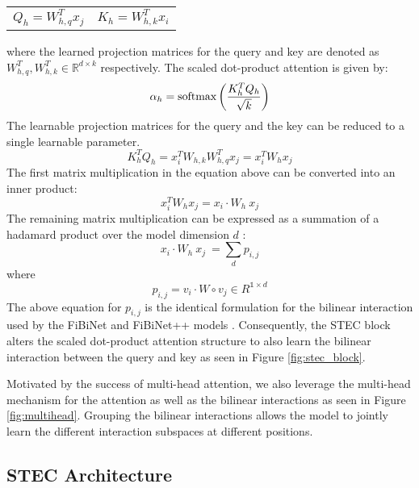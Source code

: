 \documentclass{article}
\begin{document}
\noindent
\begin{tabularx}{\linewidth}{@{}XX@{}}
\begin{equation}
  Q_h=W_{h,q}^T x_j
\end{equation}
&
\begin{equation}
  K_h=W_{h,k}^T x_i
\end{equation}
\end{tabularx}
where the learned projection matrices for the query and key are denoted as $W_{h,q}^T, W_{h,k}^T \in \mathbb{R}^{d \times k}$ respectively.
The scaled dot-product attention is given by:
\begin{equation}\alpha_h=\textup{softmax}\left ( \frac{K_h^T Q_h}{\sqrt{k}}\right ) \end{equation}
The learnable projection matrices for the query and the key can be reduced to a single learnable parameter.
\begin{equation} K_h^T Q_h = x_i^T W_{h,k} W_{h,q}^T x_j = x_i^T W_h x_j\end{equation}
The first matrix multiplication in the equation above can be converted into an inner product:  
\begin{equation}x_i^T W_h x_j = x_i \cdot W_h\ x_j\end{equation}
The remaining matrix multiplication can be expressed as a summation of a hadamard product over the model dimension $d$ : 
\begin{equation}x_i \cdot W_h\ x_j\ = \sum_{d}{p_{i,j}}\end{equation}
where
\begin{equation}p_{i,j}=v_i\cdot W\circ v_j\in R^{\mathbb{1}\times d}\end{equation}
The above equation for $p_{i,j}$ is the identical formulation for the bilinear interaction used by the FiBiNet and FiBiNet++ models \cite{fibinet2019, fibinetpp2022}. Consequently, the STEC block alters the scaled dot-product attention structure to also learn the bilinear interaction between the query and key as seen in Figure \ref{fig:stec_block}.

Motivated by the success of multi-head attention, we also leverage the multi-head mechanism for the attention as well as the bilinear interactions as seen in Figure \ref{fig:multihead}. Grouping the bilinear interactions allows the model to jointly learn the different interaction subspaces at different positions.

\subsection{STEC Architecture}
\end{document}
